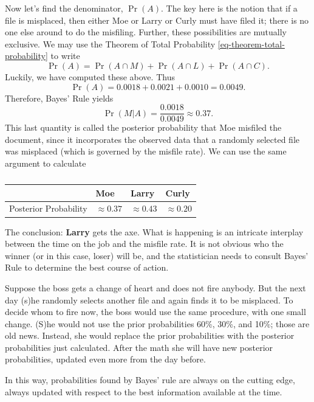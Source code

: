\documentclass[captions=tableheading]{scrbook}
\begin{document}
\begin{example}
Now let's find the denominator, \(\Pr(A)\). The key here is the notion that if a file is misplaced, then either Moe or Larry or Curly must have filed it; there is no one else around to do the misfiling. Further, these possibilities are mutually exclusive. We may use the Theorem of Total Probability \ref{eq-theorem-total-probability} to write
\[ 
\Pr(A)=\Pr(A\cap M)+\Pr(A\cap L)+\Pr(A\cap C).
\]
Luckily, we have computed these above. Thus
\[
\Pr(A)=0.0018+0.0021+0.0010=0.0049.
\]
Therefore, Bayes' Rule yields
\[
\Pr(M|A)=\frac{0.0018}{0.0049}\approx0.37.
\]
This last quantity is called the posterior probability that Moe misfiled the document, since it incorporates the observed data that a randomly selected file was misplaced (which is governed by the misfile rate). We can use the same argument to calculate

\begin{table}[htb]
\caption[Misfiling assistants: posterior]{} 
\begin{center}
\begin{tabular}{llll}
                        &  Moe              &  Larry            &  Curly            \\
\hline
 Posterior Probability  &  \(\approx0.37\)  &  \(\approx0.43\)  &  \(\approx0.20\)  \\
\end{tabular}
\end{center}
\end{table}

The conclusion: \textbf{Larry} gets the axe. What is happening is an intricate interplay between the time on the job and the misfile rate. It is not obvious who the winner (or in this case, loser) will be, and the statistician needs to consult Bayes' Rule to determine the best course of action.
\end{example}

\begin{example}
Suppose the boss gets a change of heart and does not fire anybody. But the next day (s)he randomly selects another file and again finds it to be misplaced. To decide whom to fire now, the boss would use the same procedure, with one small change. (S)he would not use the prior probabilities 60\%, 30\%, and 10\%; those are old news. Instead, she would replace the prior probabilities with the posterior probabilities just calculated. After the math she will have new posterior probabilities, updated even more from the day before.

In this way, probabilities found by Bayes' rule are always on the cutting edge, always updated with respect to the best information available at the time.
\end{example}
\end{document}
